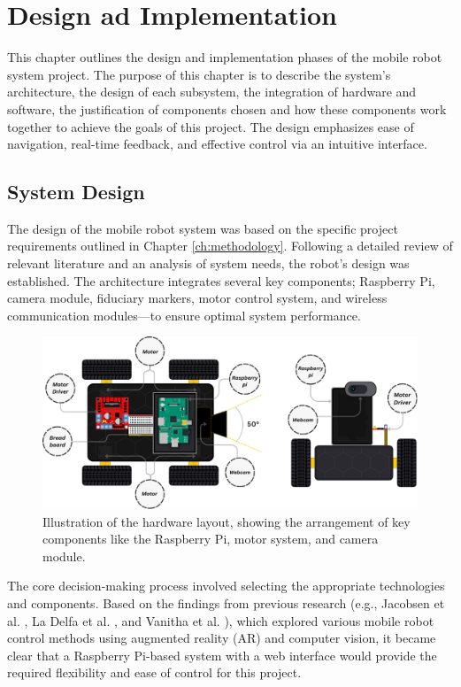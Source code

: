 \chapter{\label{ch:ch4} Design ad Implementation}

This chapter outlines the design and implementation phases of the mobile robot system project. The purpose of this chapter is to describe the system’s architecture, the design of each subsystem, the integration of hardware and software, the justification of components chosen and how these components work together to achieve the goals of this project. The design emphasizes ease of navigation, real-time feedback, and effective control via an intuitive interface.

\section{\label{sec:ch4_firstsec}System Design}

The design of the mobile robot system was based on the specific project requirements outlined in Chapter \ref{ch:methodology}. Following a detailed review of relevant literature and an analysis of system needs, the robot’s design was established. The architecture integrates several key components; Raspberry Pi, camera module, fiduciary markers, motor control system, and wireless communication modules—to ensure optimal system performance.

\begin{figure}[H]
	\centering
	\includegraphics[width=1\textwidth]{ch4/figs/robot_car.png}
	\caption{Illustration of the hardware layout, showing the arrangement of key components like the Raspberry Pi, motor system, and camera module.}
	\label{fig:hardware_layout}
\end{figure}

The core decision-making process involved selecting the appropriate technologies and components. Based on the findings from previous research (e.g., Jacobsen et al. \cite{jacobsen2018}, La Delfa et al. \cite{delfa2015}, and Vanitha et al. \cite{vanitha2016}), which explored various mobile robot control methods using augmented reality (AR) and computer vision, it became clear that a Raspberry Pi-based system with a web interface would provide the required flexibility and ease of control for this project.

